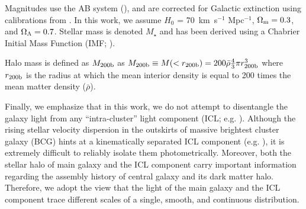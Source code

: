 \documentclass[a4paper,fleqn,usenatbib]{mnras}
\def\mstar{{$M_{\star}$}}
\begin{document}
    Magnitudes use the AB system (\citealt{Oke1983}), and are corrected for Galactic 
    extinction using calibrations from \citet{Schlafly11}.
    In this work, we assume $H_0$ = 70~km~s$^{-1}$ Mpc$^{-1}$, ${\Omega}_{\rm m}=0.3$, 
    and ${\Omega}_{\rm \Lambda}=0.7$.
    Stellar mass is denoted \mstar{} and has been derived using a Chabrier Initial Mass 
    Function (IMF; \citealt{Chabrier2003}).   
      
    Halo mass is defined as $M_{\rm 200b}$ as 
    $M_{\rm 200b}\equiv M(<r_{\rm 200b})=200\bar{\rho} 
    \frac{4}{3}\pi r_{\rm 200b}^3$ where $r_{\rm 200b}$
    is the radius at which the mean interior density is equal to 200 times
    the mean matter density ($\bar{\rho}$). 
    
    Finally, we emphasize that in this work, we do not attempt to disentangle the 
    galaxy light from any ``intra-cluster'' light component (ICL; e.g. 
    \citealt{Carlberg1997, Lin2004, Gonzalez2005, Mihos2005}). 
    Although the rising stellar velocity dispersion in the outskirts of massive 
    brightest cluster galaxy (BCG)
    hints at a kinematically separated ICL component (e.g. 
    \citealt{Dressler1979, Carter1999, Kelson2002, Bender2015, Longobardi2015}),
    it is extremely difficult to reliably isolate them photometrically.
    Moreover, both the stellar halo of main galaxy and the ICL component carry 
    important information regarding the assembly history of central galaxy and its 
    dark matter halo. 
    Therefore, we adopt the view that the light of the main galaxy and the 
    ICL component trace different scales of a single, smooth, and continuous 
    distribution.
        
\end{document}
